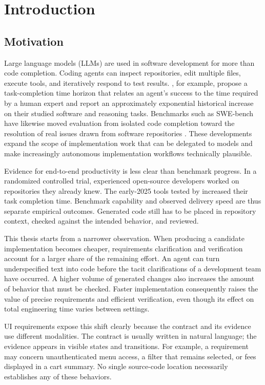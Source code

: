 \chapter{Introduction}\label{introduction}

\section{Motivation}\label{motivation}

Large language models (LLMs) are used in software development for more than code completion. Coding agents can inspect repositories, edit multiple files, execute tools, and iteratively respond to test results. \textcite{kwa2025}, for example, propose a task-completion time horizon that relates an agent's success to the time required by a human expert and report an approximately exponential historical increase on their studied software and reasoning tasks. Benchmarks such as SWE-bench have likewise moved evaluation from isolated code completion toward the resolution of real issues drawn from software repositories \autocite{jimenez2024}. These developments expand the scope of implementation work that can be delegated to models and make increasingly autonomous implementation workflows technically plausible.

Evidence for end-to-end productivity is less clear than benchmark progress. In
a randomized controlled trial, experienced open-source developers worked on
repositories they already knew. The early-2025 tools tested by \textcite{becker2025} increased their task completion time. Benchmark capability and observed
delivery speed are thus separate empirical outcomes. Generated code still has
to be placed in repository context, checked against the intended behavior, and
reviewed.

This thesis starts from a narrower observation. When producing a candidate
implementation becomes cheaper, requirements clarification and verification
account for a larger share of the remaining effort. An agent can turn
underspecified text into code before the tacit clarifications of a development
team have occurred. A higher volume of generated changes also increases the
amount of behavior that must be checked. Faster implementation consequently
raises the value of precise requirements and efficient verification, even
though its effect on total engineering time varies between settings.

UI requirements expose this shift clearly because the contract and its evidence
use different modalities. The contract is usually written in natural language;
the evidence appears in visible states and transitions. For example, a
requirement may concern unauthenticated menu access, a filter that remains
selected, or fees displayed in a cart summary. No single source-code location
necessarily establishes any of these behaviors.

